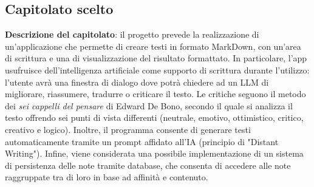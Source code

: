 \documentclass[a4paper,10pt]{article}
\begin{document}
\subsection*{Capitolato scelto}
\textbf{Descrizione del capitolato}: il progetto prevede la realizzazione di un'applicazione che permette di creare testi in formato MarkDown, con un'area di scrittura e una di visualizzazione del risultato formattato. In particolare, l'app usufruisce dell'intelligenza artificiale come supporto di scrittura durante l'utilizzo: l'utente avrà una finestra di dialogo dove potrà chiedere ad un LLM di migliorare, riassumere, tradurre o criticare il testo. Le critiche seguono il metodo dei \textit{sei cappelli del pensare} di Edward De Bono, secondo il quale si analizza il testo offrendo sei punti di vista differenti (neutrale, emotivo, ottimistico, critico, creativo e logico). Inoltre, il programma consente di generare testi automaticamente tramite un prompt affidato all'IA (principio di "Distant Writing"). Infine, viene considerata una possibile implementazione di un sistema di persistenza delle note tramite database, che consenta di accedere alle note raggruppate tra di loro in base ad affinità e contenuto.

\vspace{1\baselineskip}
\end{document}
